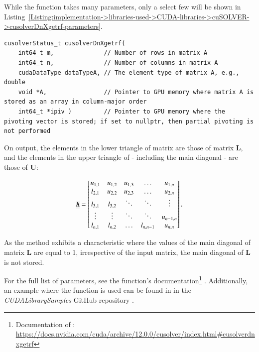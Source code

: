 While the  function takes many parameters, only a select few will be shown in Listing~\ref{Listing:implementation->libraries-used->CUDA-libraries->cuSOLVER->cusolverDnXgetrf-parameters}.

\begin{lstlisting}[caption={The function declaration of \code{cusolverDnXgetrf()} with a selection of parameters.},label={Listing:implementation->libraries-used->CUDA-libraries->cuSOLVER->cusolverDnXgetrf-parameters}]
cusolverStatus_t cusolverDnXgetrf(
	int64_t m,              // Number of rows in matrix A
	int64_t n,              // Number of columns in matrix A
	cudaDataType dataTypeA, // The element type of matrix A, e.g., double
	void *A,                // Pointer to GPU memory where matrix A is stored as an array in column-major order
	int64_t *ipiv )         // Pointer to GPU memory where the pivoting vector is stored; if set to nullptr, then partial pivoting is not performed
\end{lstlisting}

On output, the elements in the lower triangle of matrix  are those of matrix $\mathbf{L}$, and the elements in the upper triangle of  - including the main diagonal - are those of $\mathbf{U}$:

\begin{equation}
	\code{A} = {
		\begin{bmatrix}
			u _{1,1} & u _{1,2} & u _{1,3} & \ldots    & u _{1,n}   \\
			l_{2,1}	 & u _{2,2} & u _{2,3} & \ldots    & u _{2,n}   \\
			l_{3,1}  & l_{3,2} 	& \ddots   & \ddots    & \vdots 	 \\
			\vdots   & \vdots	& \ddots   & \ddots    & u _{n-1,n} \\
			l_{n,1}	 & l_{n,2}	& \ldots   & l_{n,n-1} & u _{n,n}
		\end{bmatrix}
	} \,.
	\label{Equation:implementation->libraries-used->CUDA-libraries->cuSOLVER->matrix-A-format}
\end{equation}

As the method exhibits a characteristic where the values of the main diagonal of matrix $\mathbf{L}$ are equal to 1, irrespective of the input matrix, the main diagonal of $\mathbf{L}$ is not stored.

For the full list of parameters, see the function's documentation\footnote{Documentation of : \url{https://docs.nvidia.com/cuda/archive/12.0.0/cusolver/index.html\#cusolverdnxgetrf}} \cite{5D33zKi5iStCty0r}.
Additionally, an example where the  function is used can be found in  in the \textit{CUDALibrarySamples} GitHub repository \cite{Nicely2023}.

